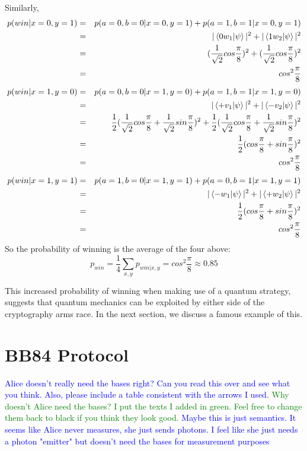 Similarly,
\begin{eqnarray*}
p(win|x=0,y=1)&=&p(a=0, b=0|x=0, y=1)+p(a=1, b=1|x=0, y=1)\\
&=&|\braket{0 w_1|\psi}|^2 + |\braket{1 w_2|\psi}|^2\\
&=&(\frac{1}{\sqrt{2}}cos\frac{\pi}{8})^2+(\frac{1}{\sqrt{2}}cos\frac{\pi}{8})^2\\
&=&cos^2 \frac{\pi}{8}
\end{eqnarray*}
\begin{eqnarray*}
p(win|x=1,y=0)&=&p(a=0, b=0|x=1, y=0)+p(a=1, b=1|x=1, y=0)\\
&=&|\braket{+ v_1|\psi}|^2 + |\braket{- v_2|\psi}|^2\\
&=&\frac{1}{2}(\frac{1}{\sqrt{2}}cos\frac{\pi}{8}+\frac{1}{\sqrt{2}}sin\frac{\pi}{8})^2+\frac{1}{2}(\frac{1}{\sqrt{2}}cos\frac{\pi}{8}+\frac{1}{\sqrt{2}}sin\frac{\pi}{8})^2\\
&=&\frac{1}{2}(cos\frac{\pi}{8}+sin\frac{\pi}{8})^2\\
&=&cos^2 \frac{\pi}{8}
\end{eqnarray*}
\begin{eqnarray*}
p(win|x=1,y=1)&=&p(a=1, b=0|x=1, y=1)+p(a=0, b=1|x=1, y=1)\\
&=&|\braket{- w_1|\psi}|^2 + |\braket{+ w_2|\psi}|^2\\
&=&\frac{1}{2}(cos\frac{\pi}{8}+sin\frac{\pi}{8})^2\\
&=&cos^2 \frac{\pi}{8}
\end{eqnarray*}
So the probability of winning is the average of the four above:
\begin{equation*}
    p_{win}=\frac{1}{4}\sum_{x,y}p_{win|x,y}=cos^2 \frac{\pi}{8} \approx 0.85
\end{equation*}


This increased probability of winning when making use of a quantum strategy, suggests that quantum mechanics can be exploited by either side of the cryptography arms race.  In the next section, we discuss a famous example of this.




\pagebreak

\section{BB84 Protocol}
\textcolor{blue}{Alice doesn't really need the bases right?  Can you read this over and see what you think.  Also, please include a table consistent with the arrows I used.} \textcolor{green}{Why doesn't Alice need the bases? I put the texts I added in green. Feel free to change them back to black if you think they look good.}
\textcolor{blue}{Maybe this is just semantics.  It seems like Alice never measures, she just sends photons.  I feel like she just needs a photon "emitter" but doesn't need the bases for measurement purposes}

